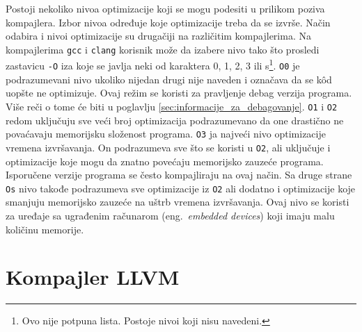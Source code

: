 \documentclass[12pt,oneside]{memoir}
\begin{document}

Postoji nekoliko nivoa optimizacije koji se mogu podesiti u prilikom poziva kompajlera.
Izbor nivoa određuje koje optimizacije treba da se izvrše.
Način odabira i nivoi optimizacije su drugačiji na različitim kompajlerima.
Na kompajlerima \verb|gcc| i \verb|clang| korisnik može da izabere nivo tako što prosledi zastavicu \verb|-O| iza koje se javlja neki od karaktera 0, 1, 2, 3 ili s\footnote{Ovo nije potpuna lista. Postoje nivoi koji nisu navedeni.}.
\verb|O0| je podrazumevani nivo ukoliko nijedan drugi nije naveden i označava da se k\^od uopšte ne optimizuje.
Ovaj režim se koristi za pravljenje debag verzija programa.
Više reči o tome će biti u poglavlju \ref{sec:informacije_za_debagovanje}.
\verb|O1| i \verb|O2| redom uključuju sve veći broj optimizacija podrazumevano da one drastično ne povaćavaju memorijsku složenost programa.
\verb|O3| ja najveći nivo optimizacije vremena izvršavanja.
On podrazumeva sve što se koristi u \verb|O2|, ali uključuje i optimizacije koje mogu da znatno povećaju memorijsko zauzeće programa.
Isporučene verzije programa se često kompajliraju na ovaj način.
Sa druge strane \verb|Os| nivo takođe podrazumeva sve optimizacije iz \verb|O2| ali dodatno i optimizacije koje smanjuju memorijsko zauzeće na uštrb vremena izvršavanja.
Ovaj nivo se koristi za uređaje sa ugrađenim računarom (eng.~{\em embedded devices}) koji imaju malu količinu memorije.

\section{Kompajler LLVM}

\end{document}
